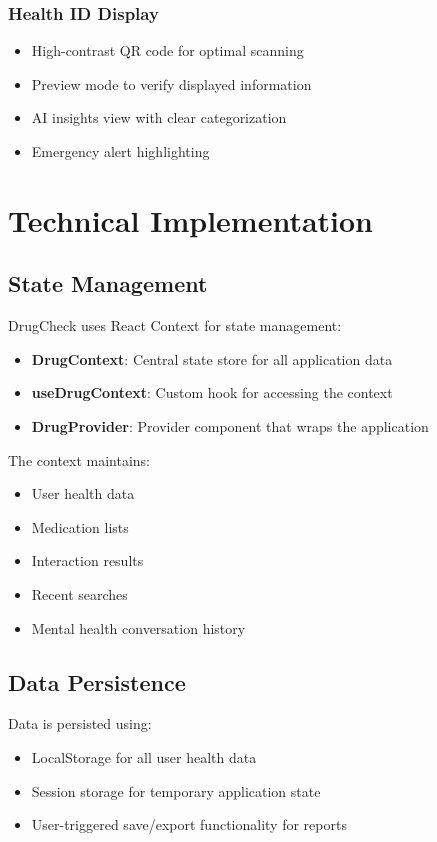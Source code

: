 \documentclass[12pt,a4paper]{report}
\begin{document}
\subsection{Health ID Display}
\begin{itemize}
    \item High-contrast QR code for optimal scanning
    \item Preview mode to verify displayed information
    \item AI insights view with clear categorization
    \item Emergency alert highlighting
\end{itemize}

\chapter{Technical Implementation}

\section{State Management}
DrugCheck uses React Context for state management:
\begin{itemize}
    \item \textbf{DrugContext}: Central state store for all application data
    \item \textbf{useDrugContext}: Custom hook for accessing the context
    \item \textbf{DrugProvider}: Provider component that wraps the application
\end{itemize}

The context maintains:
\begin{itemize}
    \item User health data
    \item Medication lists
    \item Interaction results
    \item Recent searches
    \item Mental health conversation history
\end{itemize}

\section{Data Persistence}
Data is persisted using:
\begin{itemize}
    \item LocalStorage for all user health data
    \item Session storage for temporary application state
    \item User-triggered save/export functionality for reports
\end{itemize}
\end{document}
